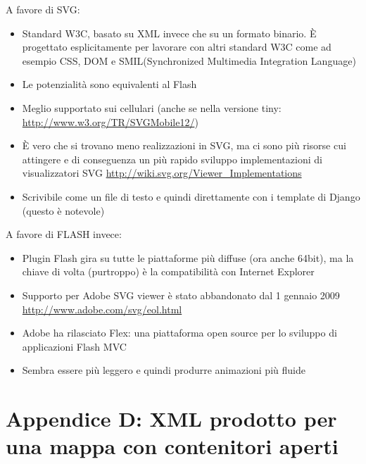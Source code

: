 \documentclass[a4wide,10pt,italian]{manual}
\begin{document}
A favore di SVG:
\begin{itemize}
\item {} 
Standard W3C, basato su XML invece che su un formato binario. È
progettato esplicitamente per lavorare con altri standard W3C come ad esempio CSS, DOM
e SMIL(Synchronized Multimedia Integration Language)

\item {} 
Le potenzialità sono equivalenti al Flash

\item {} 
Meglio supportato sui cellulari (anche se nella versione tiny: \href{http://www.w3.org/TR/SVGMobile12/}{http://www.w3.org/TR/SVGMobile12/})

\item {} 
È vero che si trovano meno realizzazioni in SVG, ma ci sono più risorse
cui attingere e di conseguenza un più rapido sviluppo
implementazioni di visualizzatori SVG \href{http://wiki.svg.org/Viewer\_Implementations}{http://wiki.svg.org/Viewer\_Implementations}

\item {} 
Scrivibile come un file di testo e quindi direttamente con i template di Django (questo è notevole)

\end{itemize}

A favore di FLASH invece:
\begin{itemize}
\item {} 
Plugin Flash gira su tutte le piattaforme più diffuse (ora anche 64bit),
ma la chiave di volta (purtroppo) è la compatibilità con Internet Explorer

\item {} 
Supporto per Adobe SVG viewer è stato abbandonato dal 1 gennaio 2009 \href{http://www.adobe.com/svg/eol.html}{http://www.adobe.com/svg/eol.html}

\item {} 
Adobe ha rilasciato Flex: una piattaforma open source per lo sviluppo di applicazioni Flash MVC

\item {} 
Sembra essere più leggero e quindi produrre animazioni più fluide

\end{itemize}

\resetcurrentobjects
\hypertarget{--doc-appendix/map-xml}{}

\hypertarget{map-xml}{}\chapter{Appendice D: XML prodotto per una mappa con contenitori aperti}
\end{document}
